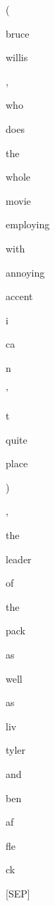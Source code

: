\documentclass[varwidth=150mm]{standalone}
\begin{document}
\begin{CJK*}{UTF8}{gbsn}
{{{\colorbox{red!4.463825225830078}{\strut (} \colorbox{red!1.4487336874008179}{\strut bruce} \colorbox{red!1.509482979774475}{\strut willis} \colorbox{red!0.0}{\strut ,} \colorbox{red!1.2962263822555542}{\strut who} \colorbox{red!0.0}{\strut does} \colorbox{red!8.202679634094238}{\strut the} \colorbox{red!0.0}{\strut whole} \colorbox{red!5.828292369842529}{\strut movie} \colorbox{red!1.3678900003433228}{\strut employing} \colorbox{red!0.0}{\strut with} \colorbox{red!1.4963138103485107}{\strut annoying} \colorbox{red!3.9909722805023193}{\strut accent} \colorbox{red!1.1911113262176514}{\strut i} \colorbox{red!2.6567957401275635}{\strut ca} \colorbox{red!7.014358997344971}{\strut n} \colorbox{red!0.0}{\strut '} \colorbox{red!3.9143357276916504}{\strut t} \colorbox{red!2.805119276046753}{\strut quite} \colorbox{red!0.0}{\strut place} \colorbox{red!1.1206791400909424}{\strut )} \colorbox{red!3.878403902053833}{\strut ,} \colorbox{red!1.578932762145996}{\strut the} \colorbox{red!0.0}{\strut leader} \colorbox{red!0.0}{\strut of} \colorbox{red!5.8217997550964355}{\strut the} \colorbox{red!1.2851817607879639}{\strut pack} \colorbox{red!1.7067713737487793}{\strut as} \colorbox{red!2.3328442573547363}{\strut well} \colorbox{red!1.1244090795516968}{\strut as} \colorbox{red!0.0}{\strut liv} \colorbox{red!0.0}{\strut tyler} \colorbox{red!0.0}{\strut and} \colorbox{red!0.0}{\strut ben} \colorbox{red!0.0}{\strut af}\colorbox{red!3.342010974884033}{\strut fle}\colorbox{red!1.4939804077148438}{\strut ck} \colorbox{red!37.105812072753906}{\strut [SEP]}
}}}
\end{CJK*}
\end{document}
